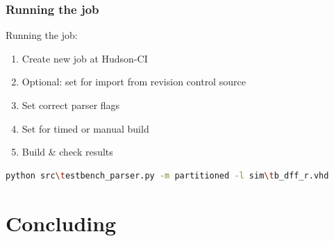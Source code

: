\documentclass[british,10pt]{beamer}
\begin{document}
\begin{frame}[fragile]\frametitle{Running the job}
Running the job:
\begin{enumerate}
\item Create new job at Hudson-CI 
\item Optional: set for import from revision control source
\item Set correct parser flags
\item Set for timed or manual build
\item Build \& check results
\end{enumerate}
\vskip5pt
\begin{lstlisting}[language=bash, tabsize=4, frame=single, framesep=2mm, belowskip=8pt, aboveskip=8pt, showstringspaces=false, basicstyle=\scriptsize]
python src\testbench_parser.py -m partitioned -l sim\tb_dff_r.vhd
\end{lstlisting}
\end{frame}




\section{Concluding}
\end{document}
